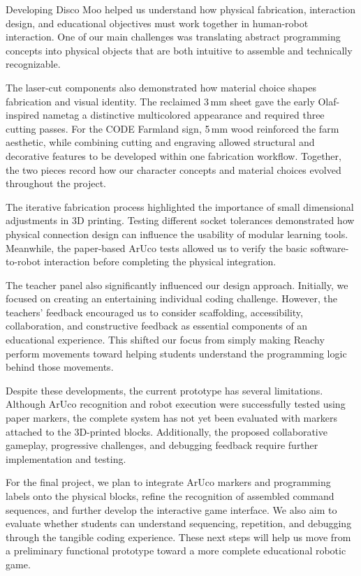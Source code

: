 \documentclass[conference]{IEEEtran}
\begin{document}
Developing Disco Moo helped us understand how physical fabrication, interaction design, and educational objectives must work together in human-robot interaction. One of our main challenges was translating abstract programming concepts into physical objects that are both intuitive to assemble and technically recognizable.

The laser-cut components also demonstrated how material choice shapes fabrication and visual identity. The reclaimed 3\,mm sheet gave the early Olaf-inspired nametag a distinctive multicolored appearance and required three cutting passes. For the CODE Farmland sign, 5\,mm wood reinforced the farm aesthetic, while combining cutting and engraving allowed structural and decorative features to be developed within one fabrication workflow. Together, the two pieces record how our character concepts and material choices evolved throughout the project.

The iterative fabrication process highlighted the importance of small dimensional adjustments in 3D printing. Testing different socket tolerances demonstrated how physical connection design can influence the usability of modular learning tools. Meanwhile, the paper-based ArUco tests allowed us to verify the basic software-to-robot interaction before completing the physical integration.

The teacher panel also significantly influenced our design approach. Initially, we focused on creating an entertaining individual coding challenge. However, the teachers' feedback encouraged us to consider scaffolding, accessibility, collaboration, and constructive feedback as essential components of an educational experience. This shifted our focus from simply making Reachy perform movements toward helping students understand the programming logic behind those movements.

Despite these developments, the current prototype has several limitations. Although ArUco recognition and robot execution were successfully tested using paper markers, the complete system has not yet been evaluated with markers attached to the 3D-printed blocks. Additionally, the proposed collaborative gameplay, progressive challenges, and debugging feedback require further implementation and testing.

For the final project, we plan to integrate ArUco markers and programming labels onto the physical blocks, refine the recognition of assembled command sequences, and further develop the interactive game interface. We also aim to evaluate whether students can understand sequencing, repetition, and debugging through the tangible coding experience. These next steps will help us move from a preliminary functional prototype toward a more complete educational robotic game.
\end{document}
